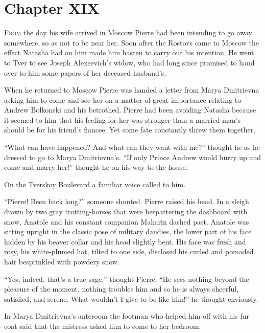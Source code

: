 \chapter*{Chapter XIX}
\ifaudio     
{} 
\fi

\lettrine[lines=2, loversize=0.3, lraise=0]{\initfamily F}{rom}
the day his wife arrived in Moscow Pierre had been intending
to go away somewhere, so as not to be near her. Soon after the
Rostovs came to Moscow the effect Natasha had on him made him
hasten to carry out his intention. He went to Tver to see Joseph
Alexeevich's widow, who had long since promised to hand over to
him some papers of her deceased husband's.

When he returned to Moscow Pierre was handed a letter from Marya
Dmitrievna asking him to come and see her on a matter of great
importance relating to Andrew Bolkonski and his betrothed. Pierre
had been avoiding Natasha because it seemed to him that his
feeling for her was stronger than a married man's should be for
his friend's fiancee.  Yet some fate constantly threw them
together.

``What can have happened? And what can they want with me?''
thought he as he dressed to go to Marya Dmitrievna's. ``If only
Prince Andrew would hurry up and come and marry her!'' thought he
on his way to the house.

On the Tverskoy Boulevard a familiar voice called to him.

``Pierre! Been back long?'' someone shouted. Pierre raised his
head. In a sleigh drawn by two gray trotting-horses that were
bespattering the dashboard with snow, Anatole and his constant
companion Makarin dashed past. Anatole was sitting upright in the
classic pose of military dandies, the lower part of his face
hidden by his beaver collar and his head slightly bent. His face
was fresh and rosy, his white-plumed hat, tilted to one side,
disclosed his curled and pomaded hair besprinkled with powdery
snow.

``Yes, indeed, that's a true sage,'' thought Pierre. ``He sees
nothing beyond the pleasure of the moment, nothing troubles him
and so he is always cheerful, satisfied, and serene. What
wouldn't I give to be like him!'' he thought enviously.

In Marya Dmitrievna's anteroom the footman who helped him off
with his fur coat said that the mistress asked him to come to her
bedroom.


